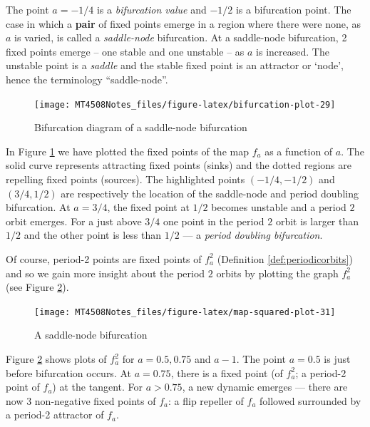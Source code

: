 \documentclass[
  a4paper,
  oneside,
  final]{krantz}
\theoremstyle{definition}
\theoremstyle{definition}
\theoremstyle{definition}
\theoremstyle{definition}
\theoremstyle{remark}
\begin{document}
The point \(a =-1/4\) is a \emph{bifurcation value} and \(-1/2\) is a bifurcation
point. The case in which a \textbf{pair} of fixed points emerge in a region
where there were none, as \(a\) is varied, is called a \emph{saddle-node}
bifurcation. At a saddle-node bifurcation, 2 fixed points emerge -- one
stable and one unstable -- as \(a\) is increased. The unstable point is a
\emph{saddle} and the stable fixed point is an attractor or `node', hence the
terminology ``saddle-node''.

\begin{figure}

{\centering \texttt{[image: MT4508Notes\_files/figure-latex/bifurcation-plot-29]} 

}

\caption{Bifurcation diagram of a saddle-node bifurcation}\label{fig:bifurcation-plot}
\end{figure}

In Figure \ref{fig:bifurcation-plot} we have plotted the fixed points
of the map \(f_{a}\) as a function of \(a\). The solid curve represents
attracting fixed points (sinks) and the dotted regions are repelling
fixed points (sources). The highlighted points \((-1/4, -1/2)\) and
\((3/4,1/2)\) are respectively the location of the saddle-node and period
doubling bifurcation. At \(a = 3/4\), the fixed point at \(1/2\) becomes
unstable and a period \(2\) orbit emerges. For a just above \(3/4\) one
point in the period \(2\) orbit is larger than \(1/2\) and the other point
is less than \(1/2\) --- a \emph{period doubling bifurcation}.

Of course, period-2 points are fixed points of \(f_{a}^2\) (Definition
\ref{def:periodicorbits}) and so we gain more insight about the period
\(2\) orbits by plotting the graph \(f_{a}^2\) (see Figure
\ref{fig:map-squared-plot}).

\begin{figure}

{\centering \texttt{[image: MT4508Notes\_files/figure-latex/map-squared-plot-31]} 

}

\caption{A saddle-node bifurcation}\label{fig:map-squared-plot}
\end{figure}

Figure \ref{fig:map-squared-plot} shows plots of \(f_{a}^2\) for
\(a = 0.5, 0.75\) and \(a-1\). The point \(a=0.5\) is just before bifurcation
occurs. At \(a=0.75\), there is a fixed point (of \(f_{a}^2\); a period-2
point of \(f_{a}\)) at the tangent. For \(a>0.75\), a new dynamic emerges
--- there are now \(3\) non-negative fixed points of \(f_{a}\): a flip
repeller of \(f_a\) followed surrounded by a period-2 attractor of
\(f_{a}\).
\end{document}
